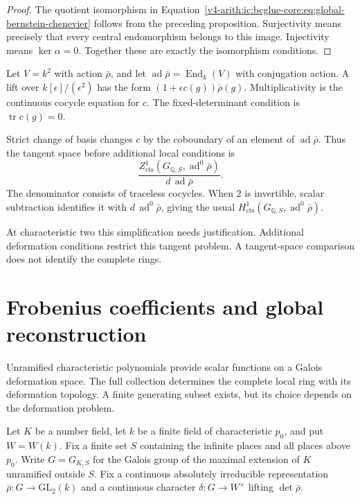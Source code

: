 \begin{proof}
The quotient isomorphism in
Equation~\eqref{v4-arith:ic:bcglue-core:eq:global-bernstein-chenevier}
follows from the preceding proposition.
Surjectivity means precisely that every central endomorphism
belongs to this image. Injectivity means $\ker\alpha=0$.
Together these are exactly the isomorphism conditions.
\end{proof}

\begin{remark}
\label{v4-arith:ic:bcglue-core:rem:chenevier-tangent}
Let $V=k^2$ with action $\bar\rho$, and let
$\operatorname{ad}\bar\rho=\operatorname{End}_k(V)$ with conjugation
action. A lift over $k[\epsilon]/(\epsilon^2)$ has the form
$(1+\epsilon c(g))\bar\rho(g)$.
Multiplicativity is the continuous cocycle equation for $c$.
The fixed-determinant condition is $\operatorname{tr}c(g)=0$.

Strict change of basis changes $c$ by the coboundary of an element
of $\operatorname{ad}\bar\rho$. Thus the tangent space before
additional local conditions is
\[
 \frac{Z^1_{\mathrm{cts}}(G_{\mathbb Q,S},
                  \operatorname{ad}^0\bar\rho)}
 {d\,\operatorname{ad}\bar\rho}.
\]
The denominator consists of traceless cocycles.
When $2$ is invertible, scalar subtraction identifies it with
$d\,\operatorname{ad}^0\bar\rho$, giving the usual
$H^1_{\mathrm{cts}}(G_{\mathbb Q,S},\operatorname{ad}^0\bar\rho)$.

At characteristic two this simplification needs justification.
Additional deformation conditions restrict this tangent problem.
A tangent-space comparison does not identify the complete rings.
\end{remark}


\section{Frobenius coefficients and global reconstruction}
\label{v4-arith:ic:frobenius}

Unramified characteristic polynomials provide scalar functions on a
Galois deformation space. The full collection determines the complete
local ring with its deformation topology. A finite generating subset
exists, but its choice depends on the deformation problem.

Let $K$ be a number field, let $k$ be a finite field of characteristic
$p_0$, and put $W=W(k)$. Fix a finite set $S$ containing the infinite
places and all places above $p_0$. Write $G=G_{K,S}$ for the Galois
group of the maximal extension of $K$ unramified outside $S$.
Fix a continuous absolutely irreducible representation
$\bar\rho:G\to\mathrm{GL}_2(k)$ and a continuous character
$\delta:G\to W^\times$ lifting $\det\bar\rho$.

